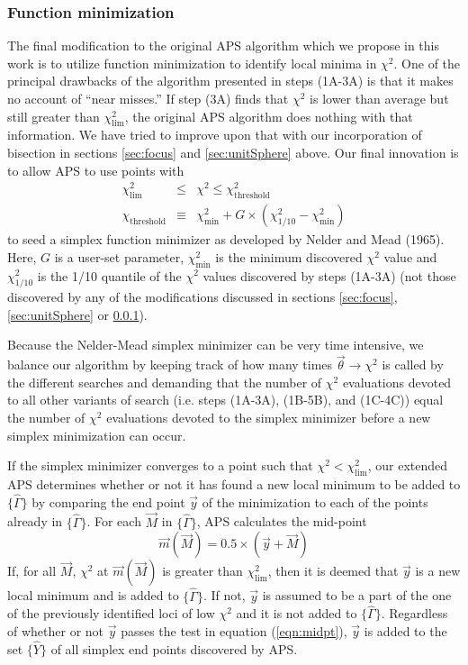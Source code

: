 \documentclass[useAMS,usenatbib]{aastex}
\begin{document}
\subsubsection{Function minimization}
\label{sec:simplex}

The final modification to the original APS algorithm which we propose in this
work is to utilize function minimization to identify local minima in $\chi^2$.
One of the principal drawbacks of the algorithm presented in steps (1A-3A) is
that it makes no account of ``near misses.''  If step (3A) finds that $\chi^2$
is lower than average but still greater than $\chi^2_\text{lim}$, the original
APS algorithm does nothing with that information.  We have tried to improve upon
that with our incorporation of bisection in sections \ref{sec:focus} and
\ref{sec:unitSphere} above.  Our final innovation is to allow APS to use points
with 
\begin{eqnarray}
\chi^2_\text{lim}&\le&\chi^2\le\chi^2_\text{threshold}\label{eqn:simplexCriterion}\\
\chi_\text{threshold}&\equiv&\chi^2_\text{min}+G\times(\chi^2_{1/10}-\chi^2_\text{min})
\label{eqn:threshold}
\end{eqnarray}
to seed a simplex function minimizer as developed by Nelder and Mead (1965).
Here, $G$ is a user-set parameter, $\chi^2_\text{min}$ is the minimum discovered
$\chi^2$ value and $\chi^2_{1/10}$ is the 1/10 quantile of the $\chi^2$ values
discovered by steps (1A-3A) (not those discovered by any of the modifications
discussed in sections \ref{sec:focus}, \ref{sec:unitSphere} or
\ref{sec:simplex}).

Because the Nelder-Mead simplex minimizer can be very time intensive, we balance our
algorithm by keeping track of how many times $\vec{\theta}\rightarrow\chi^2$
is called by the different searches and
demanding that the number of $\chi^2$ evaluations devoted to all
other variants of search (i.e. steps (1A-3A), (1B-5B), and (1C-4C)) equal the number of
$\chi^2$ evaluations devoted to the simplex minimizer before a new simplex
minimization can occur.

If the simplex minimizer converges to a point such that
$\chi^2<\chi^2_\text{lim}$, our extended APS determines whether or not it
has found a new local minimum to be added to $\{\hat{\Gamma}\}$ by comparing the end
point $\vec{y}$ of the minimization to each of the points already in
$\{\hat{\Gamma}\}$.  For each $\vec{M}$ in $\{\hat{\Gamma}\}$, APS calculates the mid-point
\begin{equation}
\label{eqn:midpt}
\vec{m}(\vec{M})=0.5\times\left(\vec{y}+\vec{M}\right)
\end{equation}
If, for all $\vec{M}$, 
$\chi^2$ at $\vec{m}(\vec{M})$ is greater
than $\chi^2_\text{lim}$, then it is deemed that $\vec{y}$ is a new local
minimum and is added to $\{\hat{\Gamma}\}$.  If not, $\vec{y}$ is assumed to be a
part of the one of the previously identified loci of low $\chi^2$ and it is not
added to $\{\hat{\Gamma}\}$.  Regardless of whether or not $\vec{y}$ passes the test in
equation (\ref{eqn:midpt}), $\vec{y}$ is added to the set $\{\hat{Y}\}$ of all
simplex end points discovered by APS.
\end{document}
